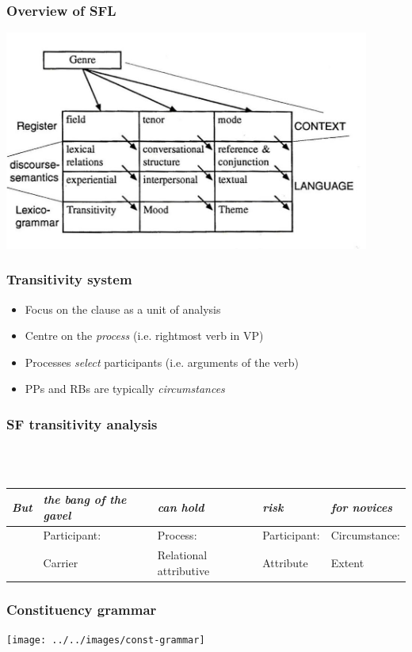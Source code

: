 \documentclass{beamer}       %
\begin{document}
\begin{frame}
    \frametitle{Overview of SFL}
    \centering
    \includegraphics[width=0.90\textwidth]{../../images/egginsfixed.jpg}
\end{frame}

\begin{frame}\frametitle{Transitivity system}
\begin{itemize}
    \item Focus on the clause as a unit of analysis
    \item Centre on the \emph{process} (i.e. rightmost verb in VP)
    \item Processes \emph{select} participants (i.e. arguments of the verb)
    \item PPs and RBs are typically \emph{circumstances}
\end{itemize}
\end{frame}

\begin{frame}\frametitle{SF transitivity analysis}

~\\
~\\
\small
\begin{tabularx}{0.99\textwidth}{|l|l|X|X|X|}
\hline
\emph{But}     & \emph{the bang of the gavel}             & \emph{can hold}          & \emph{risk} & \emph{for novices}          \\ \hline
~ & Participant: & Process: & Participant: & Circumstance:  \\
~ & Carrier & Relational \mbox{attributive} & Attribute &  Extent \\ \hline
\end{tabularx}
\end{frame}

\begin{frame}
    \frametitle{Constituency grammar}
    \centering
    \texttt{[image: ../../images/const-grammar]}
\end{frame}
\end{document}
